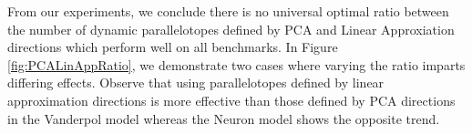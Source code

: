 
From our experiments, we conclude there is no universal optimal ratio between the number of dynamic parallelotopes defined by PCA and Linear Approxiation directions which perform well on all benchmarks. In Figure \ref{fig:PCALinAppRatio}, we demonstrate two cases where varying the ratio imparts differing effects. Observe that using parallelotopes defined by linear approximation directions is more effective than those defined by PCA directions in the Vanderpol model whereas the Neuron model shows the opposite trend.

